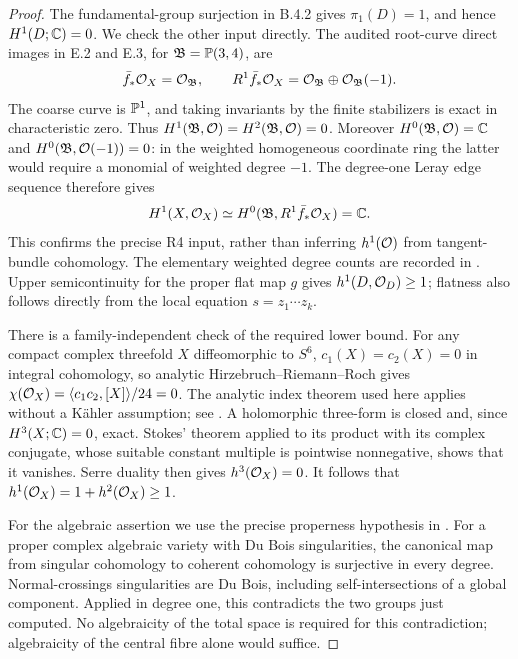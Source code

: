 \begin{proof}
The fundamental-group surjection in B.4.2 gives
$\pi_1(D)=1$, and hence $H^1(D;\mathbb C)=0$. We check the other
input directly. The audited root-curve direct images in E.2 and
E.3, for $\mathfrak B=\mathbb P(3,4)$, are
\[
 \bar f_*\mathcal O_X=\mathcal O_{\mathfrak B},\qquad
 R^1\bar f_*\mathcal O_X=\mathcal O_{\mathfrak B}\oplus
                          \mathcal O_{\mathfrak B}(-1).
\]
The coarse curve is $\mathbb P^1$, and taking invariants by the finite
stabilizers is exact in characteristic zero. Thus
$H^1(\mathfrak B,\mathcal O)=H^2(\mathfrak B,\mathcal O)=0$.
Moreover $H^0(\mathfrak B,\mathcal O)=\mathbb C$ and
$H^0(\mathfrak B,\mathcal O(-1))=0$: in the weighted homogeneous
coordinate ring the latter would require a monomial of weighted
degree $-1$. The degree-one Leray edge sequence therefore gives
\[
 H^1(X,\mathcal O_X)\simeq
 H^0(\mathfrak B,R^1\bar f_*\mathcal O_X)=\mathbb C.
\]
This confirms the precise R4 input, rather than inferring
$h^1(\mathcal O)$ from tangent-bundle cohomology. The elementary weighted
degree counts are recorded in .
Upper semicontinuity for the proper flat map $g$ gives
$h^1(D,\mathcal O_D)\geq1$; flatness also follows directly from the
local equation $s=z_1\cdots z_k$.

There is a family-independent check of the required lower bound.
For any compact complex threefold $X$ diffeomorphic to $S^6$,
$c_1(X)=c_2(X)=0$ in integral cohomology, so analytic
Hirzebruch--Riemann--Roch gives
$\chi(\mathcal O_X)=\langle c_1c_2,[X]\rangle/24=0$.
The analytic index theorem used here applies without a K\"ahler
assumption; see \citet[Theorem 4.3]{AtiyahSinger1968IIIE}.
A holomorphic three-form is closed and, since $H^3(X;\mathbb C)=0$,
exact. Stokes' theorem applied to its product with its complex
conjugate, whose suitable constant multiple is pointwise
nonnegative, shows that it vanishes. Serre duality then gives
$h^3(\mathcal O_X)=0$. It follows that
$h^1(\mathcal O_X)=1+h^2(\mathcal O_X)\geq1$.

For the algebraic assertion we use the precise properness
hypothesis in \citet[Section 1.D, p.120]{GrafKovacs2014Root}.
For a proper complex algebraic variety with Du Bois singularities,
the canonical map from singular cohomology to coherent cohomology
is surjective in every degree. Normal-crossings singularities are
Du Bois, including self-intersections of a global component.
Applied in degree one, this contradicts the two groups just
computed. No algebraicity of the total space is required for
this contradiction; algebraicity of the central fibre alone
would suffice.


\end{proof}
